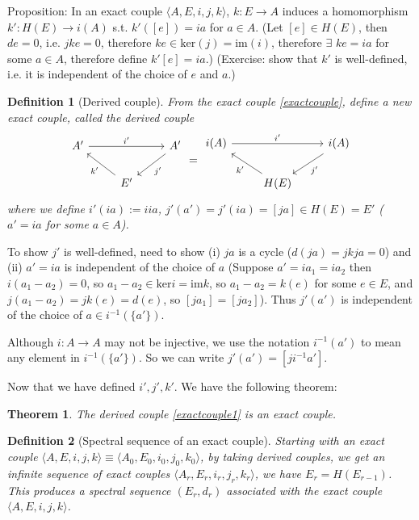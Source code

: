 \documentclass{article}
\theoremstyle{mystyle}
\newtheorem*{definition}{Definition}%
\newtheorem*{theorem*}{Theorem}
\theoremstyle{remark}
\numberwithin{equation}{section}
\begin{document}
Proposition: In an exact couple $\langle A,E,i,j,k\rangle$, $k\colon E\rightarrow A$ induces a homomorphism $k'\colon H(E)\rightarrow i(A)$ s.t. $k'([e]) = ia$ for $a \in A$. (Let $[e]\in H(E)$, then $de=0$, i.e. $jke=0$, therefore $ke \in \mathrm{ker}(j) = \mathrm{im}(i)$, therefore $\exists$ $ke = ia$ for some $a \in A$, therefore define $k'[e] = ia$.) (Exercise: show that $k'$ is well-defined, i.e. it is independent of the choice of $e$ and $a$.)


\begin{definition}[Derived couple]
From the exact couple \eqref{exactcouple}, define a new exact couple, called the \emph{derived couple}
\begin{equation}\label{exactcouple1}
\begin{tikzcd}
A'\ar[rr,"i'"] &&A' \ar[dl,"j'"]\\
&E'\ar[ul,"k'"]&
\end{tikzcd}
=
\begin{tikzcd}
i(A)\ar[rr,"i'"] &&i(A)\ar[dl,"j'"]\\
&H(E)\ar[ul,"k'"]&
\end{tikzcd}
\end{equation}
where we define $i'(ia):=iia$, $j'(a') = j'(ia)= [ja] \in H(E)=E'$ ($a'=ia$ for some $a\in A$). 
\end{definition}

To show $j'$ is well-defined, need to show (i) $ja$ is a cycle ($d(ja) = jkja=0$) and (ii) $a'=ia$ is independent of the choice of $a$ (Suppose $a'=ia_1=ia_2$ then $i(a_1-a_2)=0$, so $a_1-a_2 \in \mathrm{ker}i = \mathrm{im}k$, so $a_1-a_2 = k(e)$ for some $e\in E$, and $j(a_1-a_2) = jk(e) = d(e)$, so $[ja_1]=[ja_2]$). Thus $j'(a')$ is independent of the choice of $a \in i^{-1}(\{a'\})$.

Although $i\colon A\rightarrow A$ may not be injective, we use the notation $i^{-1}(a')$ to mean any element in $i^{-1}(\{a'\})$. So we can write $j'(a') = [ji^{-1}a']$.

Now that we have defined $i',j',k'$. We have the following theorem:

\begin{theorem*}
The derived couple \eqref{exactcouple1} is an exact couple.
\end{theorem*} 


\begin{definition}[Spectral sequence of an exact couple] Starting with an exact couple $\langle A,E,i,j,k\rangle \equiv \langle A_0,E_0,i_0,j_0,k_0\rangle$, by taking derived couples, we get an infinite sequence of exact couples $\langle A_r,E_r,i_r,j_r,k_r\rangle$, we have $E_r = H(E_{r-1})$. This produces a spectral sequence $(E_r,d_r)$ associated with the exact couple $\langle A,E,i,j,k\rangle$. 
\end{definition}
\end{document}
